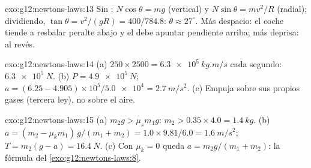 \begin{solution}{exo:g12:newtons-laws:13}
Sin : $N\cos\theta = mg$ (vertical) y
$N\sin\theta = mv^2/R$ (radial); dividiendo,
$\tan\theta = v^2/(gR) = 400/784.8$: $\theta \approx 27^\circ$. Más
despacio: el coche tiende a resbalar peralte abajo y el  debe
apuntar pendiente arriba; más deprisa: al revés.
\end{solution}

\begin{solution}{exo:g12:newtons-laws:14}
(a) $250 \times 2500 = \qty{6.3e5}{kg.m/s}$ cada segundo: 
$\qty{6.3e5}{N}$. (b) $P = \qty{4.9e5}{N}$;
$a = (6.25 - 4.905) \times 10^5 / \num{5.0e4} = \qty{2.7}{m/s^2}$.
(c) Empuja sobre sus propios gases (tercera ley), no sobre el aire.
\end{solution}

\begin{solution}{exo:g12:newtons-laws:15}
(a) $m_2 g > \mu_s m_1 g$: $m_2 > 0.35 \times 4.0 = \qty{1.4}{kg}$.
(b) $a = (m_2 - \mu_k m_1)\,g/(m_1 + m_2) = 1.0 \times 9.81/6.0 =
\qty{1.6}{m/s^2}$; $T = m_2(g - a) = \qty{16.4}{N}$.
(c) Con $\mu_k = 0$ queda $a = m_2 g/(m_1 + m_2)$: la fórmula del
\cref{exo:g12:newtons-laws:8}.
\end{solution}

